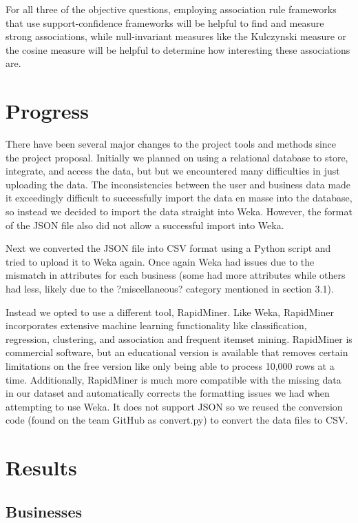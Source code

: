 \quad For all three of the objective questions, employing association rule frameworks that use support-confidence frameworks will be helpful to find and measure strong associations, while null-invariant measures like the Kulczynski measure or the cosine measure will be helpful to determine how interesting these associations are.

\section{Progress}

\quad There have been several major changes to the project tools and methods since the project proposal. Initially we planned on using a relational database to store, integrate, and access the data, but but we encountered many difficulties in just uploading the data. The inconsistencies between the user and business data made it exceedingly difficult to successfully import the data en masse into the database, so instead we decided to import the data straight into Weka. However, the format of the JSON file also did not allow a successful import into Weka. 

\quad Next we converted the JSON file into CSV format using a Python script and tried to upload it to Weka again. Once again Weka had issues due to the mismatch in attributes for each business (some had more attributes while others had less, likely due to the ?miscellaneous? category mentioned in section 3.1).

\quad Instead we opted to use a different tool, RapidMiner. Like Weka, RapidMiner incorporates extensive machine learning functionality like classification, regression, clustering, and association and frequent itemset mining. RapidMiner is commercial software, but an educational version is available that removes certain limitations on the free version like only being able to process 10,000 rows at a time. Additionally, RapidMiner is much more compatible with the missing data in our dataset and automatically corrects the formatting issues we had when attempting to use Weka. It does not support JSON so we reused the conversion code (found on the team GitHub as convert.py) to convert the data files to CSV. 

\section{Results}

\subsection{Businesses}

